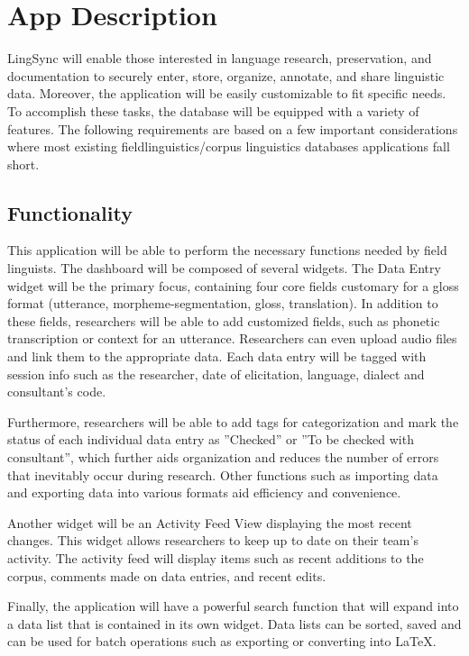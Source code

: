 \documentclass[12pt]{article}
\begin{document}
\section {App Description}

LingSync will enable those interested in language research, preservation, and documentation to securely enter, store, organize, annotate, and share linguistic data. Moreover, the application will be easily customizable to fit specific needs. To accomplish these tasks, the database will be equipped with a variety of features. 
The following requirements are based on a few important considerations where most existing fieldlinguistics/corpus linguistics databases applications fall short. 


\subsection{Functionality}

This application will be able to perform the necessary functions needed by field linguists. The dashboard will be composed of several widgets. The Data Entry widget will be the primary focus, containing four core fields customary for a gloss format (utterance, morpheme-segmentation, gloss, translation). In addition to these fields, researchers will be able to add customized fields, such as phonetic transcription or context for an utterance.  Researchers can even upload audio files and link them to the appropriate data. Each data entry will be tagged with session info such as the researcher, date of elicitation, language, dialect and consultant's code. 

Furthermore, researchers will be able to add tags for categorization and mark the status of each individual data entry as ''Checked'' or ''To be checked with consultant'', which further aids organization and reduces the number of errors that inevitably occur during research. Other functions such as importing data and exporting data into various formats aid efficiency and convenience. 

Another widget will be an Activity Feed View displaying the most recent changes. This widget allows researchers to keep up to date on their team's activity.  The activity feed will display items such as recent additions to the corpus, comments made on data entries, and recent edits. 

Finally, the application will have a powerful search function that will expand into a data list that is contained in its own widget. Data lists can be sorted, saved and can be used for batch operations such as exporting or converting into LaTeX. 
\end{document}
